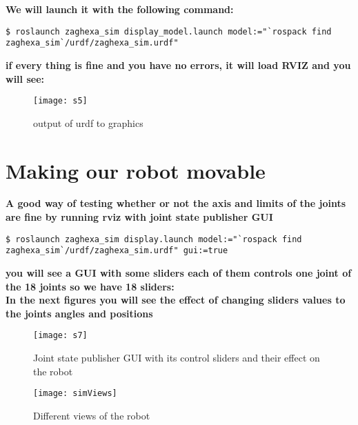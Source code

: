 \textbf{We will launch it with the following command:}
\begin{lstlisting}[language=terCmd]
$ roslaunch zaghexa_sim display_model.launch model:="`rospack find zaghexa_sim`/urdf/zaghexa_sim.urdf"
\end{lstlisting}

\textbf{if every thing is fine and you have no errors, it will load RVIZ and you will see:}
\begin{figure}[h]
	\centering
	\texttt{[image: s5]}
	\caption{output of urdf to graphics}
	\label{figure :s5}
\end{figure}

\section{Making our robot movable}
\textbf{A good way of testing whether or not the axis and limits of the joints are fine by running rviz with joint state publisher GUI}
\begin{lstlisting}[language=terCmd]
$ roslaunch zaghexa_sim display.launch model:="`rospack find zaghexa_sim`/urdf/zaghexa_sim.urdf" gui:=true
\end{lstlisting}


\textbf{you will see a GUI with some sliders each of them controls one joint of the 18 joints so we have 18 sliders:}
\\\textbf{In the next figures you will see the effect of changing sliders values to the joints angles and positions}
\begin{figure}[h]
	\centering
	\texttt{[image: s7]}
	\caption{Joint state publisher GUI with its control sliders and their effect on the robot }
	\label{fig:s7}
\end{figure}
\begin{figure}[htb]
	\centering
	\texttt{[image: simViews]}
    	\caption{Different views of the robot}
\end{figure}